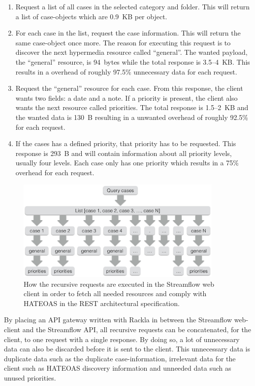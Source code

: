 \documentclass{cslthse-msc}
\begin{document}
\begin{enumerate}
	\item Request a list of all cases in the selected category and folder. This will return a list of case-objects which are 0.9~KB per object.
	\item For each case in the list, request the case information. This will return the same case-object once more. The reason for executing this request is to discover the next hypermedia resource called \enquote{general}. The wanted payload, the \enquote{general} resource, is 94~bytes while the total response is 3.5--4~KB. This results in a overhead of roughly 97.5\% unnecessary data for each request.
	\item Request the \enquote{general} resource for each case. From this response, the client wants two fields: a date and a note. If a priority is present, the client also wants the next resource called priorities. The total response is 1.5--2~KB and the wanted data is 130~B resulting in a unwanted overhead of roughly 92.5\% for each request.
	\item If the cases has a defined priority, that priority has to be requested. This response is 293~B and will contain information about all priority levels, usually four levels. Each case only has one priority which results in a 75\% overhead for each request.
\end{enumerate}

\begin{figure}[H]
  \centering
    \begin{center}
      \includegraphics[width=0.9\textwidth]{images/streamflow_cases.png}
    \end{center}
  \caption{How the recursive requests are executed in the Streamflow web client in order to fetch all needed resources and comply with HATEOAS in the REST architectural specification.}
\end{figure}

By placing an API gateway written with Rackla in between the Streamflow web-client and the Streamflow API, all recursive requests can be concatenated, for the client, to one request with a single response. By doing so, a lot of unnecessary data can also be discarded before it is sent to the client. This unnecessary data is duplicate data such as the duplicate case-information, irrelevant data for the client such as HATEOAS discovery information and unneeded data such as unused priorities.
\end{document}
